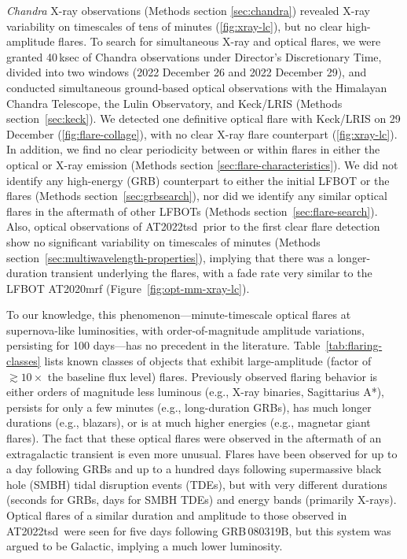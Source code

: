 \documentclass{nature_plusfigure}
\newcommand{\at}{AT2022tsd}
\begin{document}
\emph{Chandra} X-ray observations\cite{Matthews2022} (Methods section \ref{sec:chandra}) revealed X-ray variability on timescales of tens of minutes (\ref{fig:xray-lc}), but no clear high-amplitude flares. To search for simultaneous X-ray and optical flares,
we were granted 40\,ksec of Chandra observations under Director's Discretionary Time, divided into two windows (2022 December 26 and 2022 December 29),
and conducted simultaneous ground-based optical observations with the Himalayan Chandra Telescope, the Lulin Observatory, and Keck/LRIS (Methods section~\ref{sec:keck}). We detected one definitive optical flare with Keck/LRIS on 29 December (\ref{fig:flare-collage}), with no clear X-ray flare counterpart (\ref{fig:xray-lc}).
In addition, we find no clear periodicity between or within flares in either the optical or X-ray emission (Methods section \ref{sec:flare-characteristics}).
We did not identify any high-energy (GRB) counterpart to either the initial LFBOT or the flares (Methods section~\ref{sec:grbsearch}), nor did we identify any similar optical flares in the aftermath of other LFBOTs (Methods section~\ref{sec:flare-search}).
Also, optical observations of \at\ prior to the first clear flare detection show no significant variability on timescales of minutes (Methods section~\ref{sec:multiwavelength-properties}), implying that there was a longer-duration transient underlying the flares, with a fade rate very similar to the LFBOT AT2020mrf\cite{Yao2022} (Figure~\ref{fig:opt-mm-xray-lc}).

To our knowledge, this phenomenon---minute-timescale optical flares at supernova-like luminosities, with order-of-magnitude amplitude variations, persisting for 100 days---has no precedent in the literature.
 Table~\ref{tab:flaring-classes} lists known classes of objects that exhibit large-amplitude (factor of $\gtrsim10\times$ the baseline flux level) flares. Previously observed flaring behavior is either orders of magnitude less luminous (e.g., X-ray binaries\cite{Fender1997}, Sagittarius A*\cite{Marrone2008}), persists for only a few minutes (e.g., long-duration GRBs\cite{Racusin2008}), has much longer durations (e.g., blazars\cite{Nesci2021}), or is at much higher energies (e.g., magnetar giant flares\cite{Hurley1999}).
The fact that these optical flares were observed in the aftermath of an extragalactic transient is even more unusual.
Flares have been observed for up to a day following GRBs\cite{Kumar2015} and up to a hundred days following supermassive black hole (SMBH) tidal disruption events (TDEs\cite{Mangano2016,vanVelzen2021}), but with very different durations (seconds for GRBs, days for SMBH TDEs) and energy bands (primarily X-rays). Optical flares of a similar duration and amplitude to those observed in \at\ were seen for five days following GRB\,080319B, but this system was argued to be Galactic\cite{Kasliwal2008,CastroTirado2008,Stefanescu2008}, implying a much lower luminosity.
\end{document}
